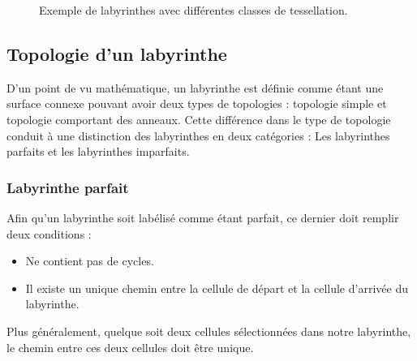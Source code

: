 \begin{figure}[htp] 
    \centering
    \hfill%
        \hfill%
    \caption{Exemple de labyrinthes avec différentes classes de tessellation.}
\end{figure}


\subsection{Topologie d'un labyrinthe}
D’un point de vu mathématique, un labyrinthe est définie comme étant une surface connexe pouvant avoir deux types de topologies : topologie simple et topologie comportant des anneaux. Cette différence dans le type de topologie conduit à une distinction des labyrinthes en deux catégories : Les labyrinthes parfaits et les labyrinthes imparfaits.

\subsubsection{Labyrinthe parfait}
Afin qu'un labyrinthe soit labélisé comme étant parfait, ce dernier doit remplir deux conditions :
\begin{itemize}
\item Ne contient pas de cycles.
\item Il existe un unique chemin entre la cellule de départ et la cellule d’arrivée du labyrinthe.
\end{itemize}
Plus généralement, quelque soit deux cellules sélectionnées dans notre labyrinthe, le chemin entre ces deux cellules doit être unique.

